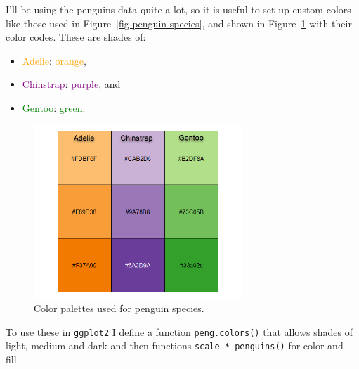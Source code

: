 \documentclass[
  letterpaper,
  10pt,
  krantz2]{krantz}
\providecommand{\tightlist}{%
  \setlength{\itemsep}{0pt}\setlength{\parskip}{0pt}}\usepackage{longtable,booktabs,array}
\begin{document}
I'll be using the penguins data quite a lot, so it is useful to set up
custom colors like those used in Figure~\ref{fig-penguin-species}, and
shown in Figure~\ref{fig-peng-colors} with their color codes. These are
shades of:

\begin{itemize}
\tightlist
\item
  \textcolor{orange}{Adelie}: \textcolor{orange}{orange},
\item
  \textcolor{purple}{Chinstrap}: \textcolor{purple}{purple}, and
\item
  \textcolor{green}{Gentoo}: \textcolor{green}{green}.
\end{itemize}

\begin{figure}

{\centering \includegraphics[width=0.7\textwidth,height=\textheight]{images/peng-colors.png}

}

\caption{\label{fig-peng-colors}Color palettes used for penguin
species.}

\end{figure}

To use these in \texttt{ggplot2} I define a function
\texttt{peng.colors()} that allows shades of light, medium and dark and
then functions \texttt{scale\_*\_penguins()} for color and fill.
\end{document}
